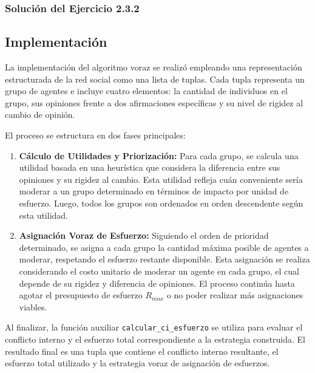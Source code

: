 \documentclass[11pt,letter]{article}
\begin{document}
    \subsubsection{Solución del Ejercicio 2.3.2}

    \subsection{Implementación}

    La implementación del algoritmo voraz se realizó empleando una representación estructurada de la red social como una lista de tuplas. Cada tupla representa un grupo de agentes e incluye cuatro elementos: la cantidad de individuos en el grupo, sus opiniones frente a dos afirmaciones específicas y su nivel de rigidez al cambio de opinión.

    El proceso se estructura en dos fases principales:

    \begin{enumerate}
        \item \textbf{Cálculo de Utilidades y Priorización:} Para cada grupo, se calcula una utilidad basada en una heurística que considera la diferencia entre sus opiniones y su rigidez al cambio. Esta utilidad refleja cuán conveniente sería moderar a un grupo determinado en términos de impacto por unidad de esfuerzo. Luego, todos los grupos son ordenados en orden descendente según esta utilidad.

        \item \textbf{Asignación Voraz de Esfuerzo:} Siguiendo el orden de prioridad determinado, se asigna a cada grupo la cantidad máxima posible de agentes a moderar, respetando el esfuerzo restante disponible. Esta asignación se realiza considerando el costo unitario de moderar un agente en cada grupo, el cual depende de su rigidez y diferencia de opiniones. El proceso continúa hasta agotar el presupuesto de esfuerzo $R_{max}$ o no poder realizar más asignaciones viables.
    \end{enumerate}

    Al finalizar, la función auxiliar \texttt{calcular\_ci\_esfuerzo} se utiliza para evaluar el conflicto interno y el esfuerzo total correspondiente a la estrategia construida. El resultado final es una tupla que contiene el conflicto interno resultante, el esfuerzo total utilizado y la estrategia voraz de asignación de esfuerzos.
\end{document}
